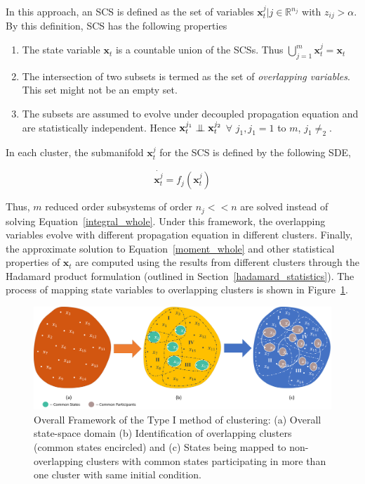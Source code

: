 In this approach, an SCS is defined as the set of variables  $\textbf{x}_t^j|j \in \mathbb{R}^{n_j}$ with $z_{ij} > \alpha $. By this definition, SCS has the following properties 
\begin{enumerate}
\item The state variable $\textbf{x}_t$ is a countable union of the SCSs. Thus $\bigcup _{j=1}^m \textbf{x}_t^j = \textbf{x}_t $
\item The intersection of two subsets is termed as the set of \textit{overlapping variables}. This set might not be an empty set.
\item The subsets are assumed to evolve under decoupled propagation equation and are statistically independent. Hence $\textbf{x}_t^{j_1} \mathrel{\perp\mspace{-10mu}\perp} \textbf{x}_t^{j_2}$ $\forall$ $j_1, j_1 = 1$ to $m$, $j_1 \neq _2$.   
\end{enumerate}
In each cluster, the submanifold $\textbf{x}_t^j$ for the SCS is defined by the following SDE,

\begin{equation}
\dot{\textbf{x}_t^j} = f_j(\textbf{x}_t^j)  
\end{equation}  

Thus, $m$ reduced order subsystems of order $n_j << n$ are solved instead of solving Equation~\ref{integral_whole}. Under this framework, the overlapping variables evolve with different propagation equation in different clusters. Finally, the approximate solution to Equation~\ref{moment_whole} and other statistical properties of $\textbf{x}_t$ are computed using the results from different clusters through the Hadamard product formulation (outlined in Section~\ref{hadamard_statistics}). The process of mapping state variables to overlapping clusters is shown in Figure~\ref{framework_TypeI}. 

\begin{figure}[H]
\begin{center}
\includegraphics[width=\textwidth]{figures_2/TypeI}
\caption{Overall Framework of the Type I method of clustering: (a) Overall state-space domain (b) Identification of overlapping clusters (common states encircled) and (c) States being mapped to non-overlapping clusters with common states participating in more than one cluster with same initial condition.}
\label{framework_TypeI}
\end{center}
\end{figure}


